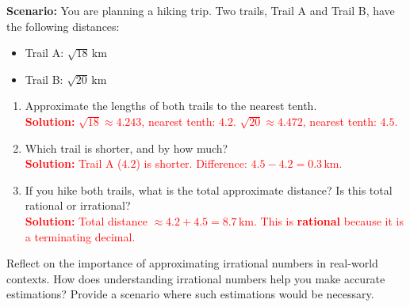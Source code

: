 \documentclass[12pt]{article}
\begin{document}
\begin{tcolorbox}[colframe=black!60, colback=white, 
coltitle=black, colbacktitle=black!15, fonttitle=\bfseries\Large, 
title=Performance Task: Comparing Routes, halign title=center, left=10pt, right=10pt, top=10pt, bottom=50pt]
\textbf{Scenario:} You are planning a hiking trip. Two trails, Trail A and Trail B, have the following distances:
\begin{itemize}
    \item Trail A: \( \sqrt{18} \, \text{km} \)
    \item Trail B: \( \sqrt{20} \, \text{km} \)
\end{itemize}
\begin{enumerate}[itemsep=3em]
    \item Approximate the lengths of both trails to the nearest tenth.\\
    \textcolor{red}{\textbf{Solution:} \( \sqrt{18} \approx 4.243 \), nearest tenth: \(4.2\). \( \sqrt{20} \approx 4.472 \), nearest tenth: \(4.5\).}

    \item Which trail is shorter, and by how much?\\
    \textcolor{red}{\textbf{Solution:} Trail A (\(4.2\)) is shorter. Difference: \(4.5 - 4.2 = 0.3 \, \text{km}\).}

    \item If you hike both trails, what is the total approximate distance? Is this total rational or irrational?\\
    \textcolor{red}{\textbf{Solution:} Total distance \( \approx 4.2 + 4.5 = 8.7 \, \text{km}\). This is \textbf{rational} because it is a terminating decimal.}
\end{enumerate}
\end{tcolorbox}

\vspace{1em}

\begin{tcolorbox}[colframe=black!60, colback=white, 
coltitle=black, colbacktitle=black!15, fonttitle=\bfseries\Large, 
title=Reflection, halign title=center, left=10pt, right=10pt, top=10pt, bottom=80pt]
Reflect on the importance of approximating irrational numbers in real-world contexts. How does understanding irrational numbers help you make accurate estimations? Provide a scenario where such estimations would be necessary.
\end{tcolorbox}
\end{document}
